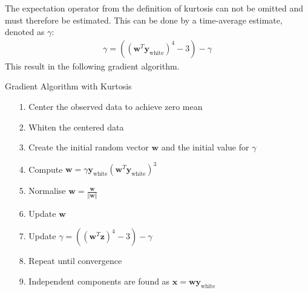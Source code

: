The expectation operator from the definition of kurtosis can not be omitted and must therefore be estimated. This can be done by a time-average estimate, denoted as $\gamma$:
\begin{align*}
\gamma = ((\mathbf{w}^T \mathbf{y}_{\text{white}})^4 - 3) - \gamma
\end{align*}
This result in the following gradient algorithm.
\begin{algorithm}[H]
\caption{Gradient Algorithm with Kurtosis}
\begin{itemize}
\item[1.] Center the observed data to achieve zero mean
\item[2.] Whiten the centered data
\item[3.] Create the initial random vector $\mathbf{w}$ and the initial value for $\gamma$
\item[4.] Compute $\mathbf{w} = \gamma \mathbf{y}_{\text{white}} (\mathbf{w}^T \mathbf{y}_{\text{white}})^3$
\item[5.] Normalise $\mathbf{w} = \frac{\mathbf{w}}{\Vert \mathbf{w} \Vert}$
\item[6.] Update $\mathbf{w}$
\item[7.] Update $\gamma = ((\mathbf{w}^T \mathbf{z})^4 - 3) - \gamma$
\item[8.] Repeat until convergence
\item[9.] Independent components are found as $\mathbf{x} = \mathbf{w} \mathbf{y}_{\text{white}}$
\end{itemize}
\end{algorithm}

